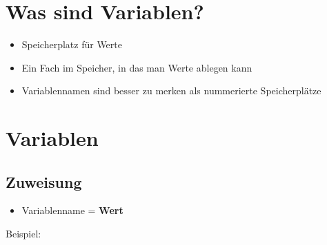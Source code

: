 



\subtitle{Kapitel 3: Daten Zwischenspeichern}
\maketitle

\section{Was sind Variablen?}
\begin{frame}[fragile]
	\slidehead
	\begin{itemize}
		\item Speicherplatz für Werte
		\pause
		\item Ein Fach im Speicher, in das man Werte ablegen kann
		\pause
		\item Variablennamen sind besser zu merken als nummerierte Speicherplätze
	\end{itemize}
\end{frame}

\section{Variablen}
\subsection{Zuweisung}
\begin{frame}
	\slidehead
	\begin{itemize}
		\item Variablenname = \textbf{Wert}
	\end{itemize}
	\pause
	Beispiel:
\end{frame}

